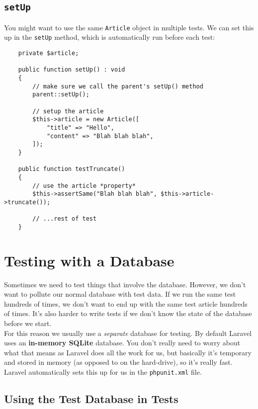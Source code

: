 \subsection{\texttt{setUp}}

You might want to use the same \texttt{Article} object in multiple tests. We can set this up in the \texttt{setUp} method, which is automatically run before each test:

\begin{verbatim}
    private $article;

    public function setUp() : void
    {
        // make sure we call the parent's setUp() method
        parent::setUp();

        // setup the article
        $this->article = new Article([
            "title" => "Hello",
            "content" => "Blah blah blah",
        ]);
    }

    public function testTruncate()
    {
        // use the article *property*
        $this->assertSame("Blah blah blah", $this->article->truncate());

        // ...rest of test
    }
\end{verbatim}


\section{Testing with a Database}

Sometimes we need to test things that involve the database. However, we don't want to pollute our normal database with test data. If we run the same test hundreds of times, we don't want to end up with the same test article hundreds of times. It's also harder to write tests if we don't know the state of the database before we start.
\\

For this reason we usually use a \textit{separate} database for testing. By default Laravel uses an \textbf{in-memory SQLite} database. You don't really need to worry about what that means as Laravel does all the work for us, but basically it's temporary and stored in memory (as opposed to on the hard-drive), so it's really fast.
\\

Laravel automatically sets this up for us in the \texttt{phpunit.xml} file.


\subsection{Using the Test Database in Tests}

